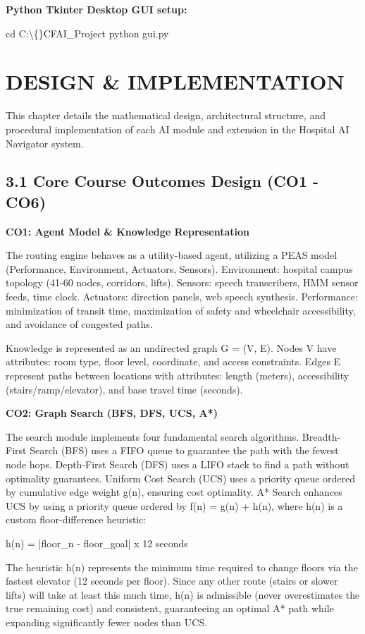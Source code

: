 \documentclass[12pt,a4paper]{report}
\begin{document}
\textbf{Python Tkinter Desktop GUI setup:}

cd C:\textbackslash\{\}CFAI\_Project
python gui.py


\chapter{DESIGN \& IMPLEMENTATION}

This chapter details the mathematical design, architectural structure, and procedural implementation of each AI module and extension in the Hospital AI Navigator system.


\section{3.1 Core Course Outcomes Design (CO1 - CO6)}

\textbf{CO1: Agent Model \& Knowledge Representation}

The routing engine behaves as a utility-based agent, utilizing a PEAS model (Performance, Environment, Actuators, Sensors). Environment: hospital campus topology (41-60 nodes, corridors, lifts). Sensors: speech transcribers, HMM sensor feeds, time clock. Actuators: direction panels, web speech synthesis. Performance: minimization of transit time, maximization of safety and wheelchair accessibility, and avoidance of congested paths.

Knowledge is represented as an undirected graph G = (V, E). Nodes V have attributes: room type, floor level, coordinate, and access constraints. Edges E represent paths between locations with attributes: length (meters), accessibility (stairs/ramp/elevator), and base travel time (seconds).

\textbf{CO2: Graph Search (BFS, DFS, UCS, A*)}

The search module implements four fundamental search algorithms. Breadth-First Search (BFS) uses a FIFO queue to guarantee the path with the fewest node hops. Depth-First Search (DFS) uses a LIFO stack to find a path without optimality guarantees. Uniform Cost Search (UCS) uses a priority queue ordered by cumulative edge weight g(n), ensuring cost optimality. A* Search enhances UCS by using a priority queue ordered by f(n) = g(n) + h(n), where h(n) is a custom floor-difference heuristic:

h(n) = |floor\_n - floor\_goal| x 12 seconds

The heuristic h(n) represents the minimum time required to change floors via the fastest elevator (12 seconds per floor). Since any other route (stairs or slower lifts) will take at least this much time, h(n) is admissible (never overestimates the true remaining cost) and consistent, guaranteeing an optimal A* path while expanding significantly fewer nodes than UCS.
\end{document}
